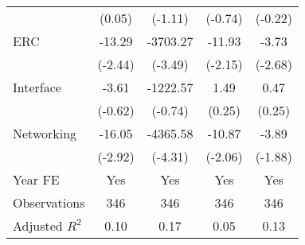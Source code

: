 {\begin{tabular}{l*{4}{c}}
                                   &      (0.05)         &     (-1.11)         &     (-0.74)         &     (-0.22)         \\
[1em]
ERC                                &      -13.29\sym{**} &    -3703.27\sym{***}&      -11.93\sym{**} &       -3.73\sym{***}\\
                                   &     (-2.44)         &     (-3.49)         &     (-2.15)         &     (-2.68)         \\
[1em]
Interface                          &       -3.61         &    -1222.57         &        1.49         &        0.47         \\
                                   &     (-0.62)         &     (-0.74)         &      (0.25)         &      (0.25)         \\
[1em]
Networking                         &      -16.05\sym{***}&    -4365.58\sym{***}&      -10.87\sym{**} &       -3.89\sym{*}  \\
                                   &     (-2.92)         &     (-4.31)         &     (-2.06)         &     (-1.88)         \\
[1em]
Year FE                            &         Yes         &         Yes         &         Yes         &         Yes         \\
\hline
Observations                       &         346         &         346         &         346         &         346         \\
Adjusted \(R^{2}\)                 &        0.10         &        0.17         &        0.05         &        0.13         \\
\hline\hline
\end{tabular}
}
